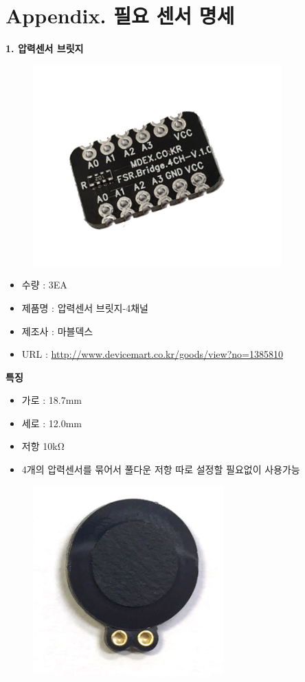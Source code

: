 \documentclass[a4paper, 11pt]{article}
\begin{document}
\newpage
\section*{Appendix. 필요 센서 명세}
{\large{\textbf{1. 압력센서 브릿지}}}

\begin{figure}[h!]
\centering
\includegraphics[scale=0.7]{./Figure/CF1.png}
\end{figure}

\begin{itemize}
\item 수량 : 3EA
\item 제품명 : 압력센서 브릿지-4채널
\item 제조사 : 마블덱스
\item URL : \url{http://www.devicemart.co.kr/goods/view?no=1385810}
\end{itemize}

\textbf{특징}

\begin{itemize}
 \item 가로 : 18.7mm 
 \item 세로 : 12.0mm 
 \item 저항 10k$\mathrm{\Omega}$
 \item 4개의 압력센서를 묶어서 풀다운 저항 따로 설정할 필요없이 사용가능
\end{itemize}


\begin{figure}[h!]
\centering
\includegraphics[scale=0.7]{./Figure/CF3.png}
\end{figure}
\end{document}
